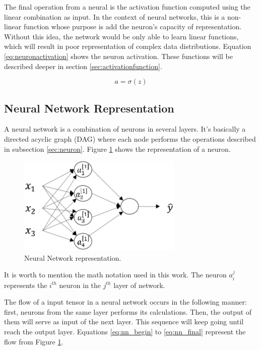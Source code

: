 The final operation from a neural is the activation function computed using the linear combination as input. In the context of neural networks, this is a non-linear function whose purpose is add the neuron's capacity of representation. Without this idea, the network would be only able to learn linear functions, which will result in poor representation of complex data distributions. Equation \ref{eq:neuronactivation} shows the neuron activation. These functions will be described deeper in section \ref{sec:activationfunction}.

\begin{equation}
a = \sigma({z})
\label{eq:neuronactivation}
\end{equation}


\subsection{Neural Network Representation}

A neural network is a combination of neurons in several layers. It's basically a directed acyclic graph (DAG) where each node performs the operations described in subsection \ref{sec:neuron}. Figure \ref{fig:neuralnetworkrepresentation} shows the representation of a neuron.

\begin{figure}[!htbp]
	\centering
	\includegraphics[width=0.7\textwidth]{Cap3/neuralnetworkrepresentation.eps}
	\caption{Neural Network representation.}
	\label{fig:neuralnetworkrepresentation}
\end{figure}

It is worth to mention the math notation used in this work. The neuron $a^{j}_{i}$ represents the $i^{th}$ neuron in the $j^{th}$ layer of network.

The flow of a input tensor in a neural network occurs in the following manner: first, neurons from the same layer performs its calculations. Then, the output of them will serve as input of the next layer. This sequence will keep going until reach the output layer. Equations \ref{eq:nn_begin} to \ref{eq:nn_final} represent the flow from Figure \ref{fig:neuralnetworkrepresentation}.


